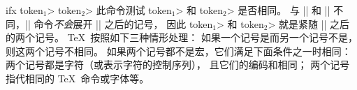 \begindesc
\ctspecial ifx {\<token$_1$> \<token$_2$>}
\explain
此命令测试 \<token$_1$> 和 \<token$_2$> 是否相同。
与 |\if| 和 |\ifcat| 不同，|\ifx| 命令\emph{不会}展开 |\ifx| 之后的记号，
因此 \<token$_1$> 和 \<token$_2$> 就是紧随 |\ifx| 之后的两个记号。
\TeX\ 按照如下三种情形处理：
\olist
\li 如果一个记号是而另一个记号不是，则这两个记号不相同。
\li 如果两个记号都不是宏，它们满足下面条件之一时相同：
\olist
\li 两个记号都是字符（或表示字符的控制序列），
且它们的编码和相同；
\li 两个记号指代相同的 \TeX\ 命令或字体等。
